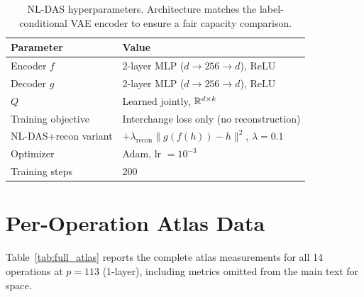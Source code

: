 \begin{table}[H]
\centering
\small
\begin{tabular}{ll}
\toprule
\textbf{Parameter} & \textbf{Value} \\
\midrule
Encoder $f$ & 2-layer MLP ($d \to 256 \to d$), ReLU \\
Decoder $g$ & 2-layer MLP ($d \to 256 \to d$), ReLU \\
$Q$ & Learned jointly, $\mathbb{R}^{d \times k}$ \\
Training objective & Interchange loss only (no reconstruction) \\
NL-DAS+recon variant & $+ \lambda_\text{recon} \|g(f(h)) - h\|^2$, $\lambda = 0.1$ \\
Optimizer & Adam, lr $= 10^{-3}$ \\
Training steps & 200 \\
\bottomrule
\end{tabular}
\caption{NL-DAS hyperparameters. Architecture matches the label-conditional VAE encoder
to ensure a fair capacity comparison.}
\label{tab:hp_nldas}
\end{table}


\section{Per-Operation Atlas Data}
\label{app:atlas_data}

Table~\ref{tab:full_atlas} reports the complete atlas measurements for all
14 operations at $p = 113$ (1-layer), including metrics omitted from the
main text for space.


